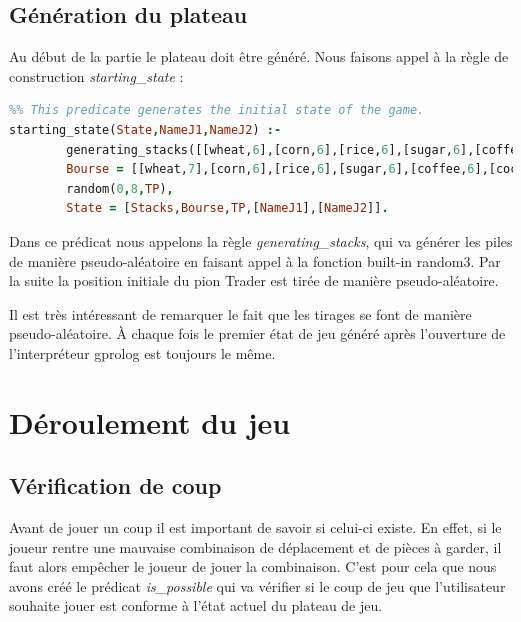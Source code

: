 \documentclass[a4paper, 11pt,twoside, leqno]{report}
\theoremstyle{plain}
\begin{document}
\subsection{Génération du plateau}
Au début de la partie le plateau doit être généré. Nous faisons appel à la règle de construction \textit{starting\_{}state} :
\begin{lstlisting}[language=prolog]
%%%% starting_state(?State_To_Be_Generated,+Player_1's_Name,+Player_1's_Name)
%% This predicate generates the initial state of the game. 
starting_state(State,NameJ1,NameJ2) :-
		generating_stacks([[wheat,6],[corn,6],[rice,6],[sugar,6],[coffee,6],[cocoa,6]],Stacks,9),
		Bourse = [[wheat,7],[corn,6],[rice,6],[sugar,6],[coffee,6],[cocoa,6]],
		random(0,8,TP),
		State = [Stacks,Bourse,TP,[NameJ1],[NameJ2]].
\end{lstlisting}
Dans ce prédicat nous appelons la règle \textit{generating\_{}stacks}, qui va générer les piles de manière pseudo-aléatoire en faisant appel à la fonction built-in random\/{}3. Par la suite la position initiale du pion Trader est tirée de manière pseudo-aléatoire. 

Il est très intéressant de remarquer le fait que les tirages se font de manière pseudo-aléatoire. À chaque fois le premier état de jeu généré après l'ouverture de l'interpréteur gprolog est toujours le même. 
\section{Déroulement du jeu}
\subsection{Vérification de coup}
Avant de jouer un coup il est important de savoir si celui-ci existe. En effet, si le joueur rentre une mauvaise combinaison de déplacement et de pièces à garder, il faut alors empêcher le joueur de jouer la combinaison. C'est pour cela que nous avons créé le prédicat \textit{is\_{}possible} qui va vérifier si le coup de jeu que l'utilisateur souhaite jouer est conforme à l'état actuel du plateau de jeu.
\newpage
\end{document}

